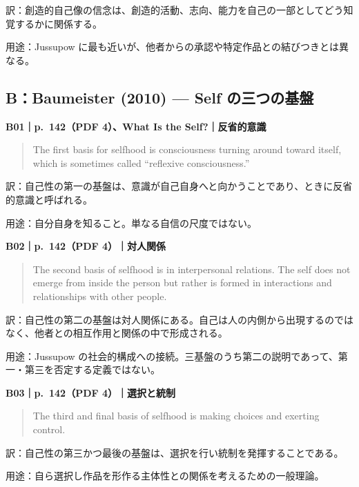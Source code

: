 \documentclass[
  11pt,
  a4paper,
]{article}
\begin{document}
訳：創造的自己像の信念は、創造的活動、志向、能力を自己の一部としてどう知覚するかに関係する。

用途：Jussupow
に最も近いが、他者からの承認や特定作品との結びつきとは異なる。

\subsection{B：Baumeister (2010) --- Self
の三つの基盤}\label{bbaumeister-2010-self-ux306eux4e09ux3064ux306eux57faux76e4}


\textbf{B01｜p.~142（PDF 4）、What Is the Self?｜反省的意識}

\begin{quote}
The first basis for selfhood is consciousness turning around toward
itself, which is sometimes called ``reflexive consciousness.''
\end{quote}

訳：自己性の第一の基盤は、意識が自己自身へと向かうことであり、ときに反省的意識と呼ばれる。

用途：自分自身を知ること。単なる自信の尺度ではない。


\textbf{B02｜p.~142（PDF 4）｜対人関係}

\begin{quote}
The second basis of selfhood is in interpersonal relations. The self
does not emerge from inside the person but rather is formed in
interactions and relationships with other people.
\end{quote}

訳：自己性の第二の基盤は対人関係にある。自己は人の内側から出現するのではなく、他者との相互作用と関係の中で形成される。

用途：Jussupow
の社会的構成への接続。三基盤のうち第二の説明であって、第一・第三を否定する定義ではない。


\textbf{B03｜p.~142（PDF 4）｜選択と統制}

\begin{quote}
The third and final basis of selfhood is making choices and exerting
control.
\end{quote}

訳：自己性の第三かつ最後の基盤は、選択を行い統制を発揮することである。

用途：自ら選択し作品を形作る主体性との関係を考えるための一般理論。
\end{document}
